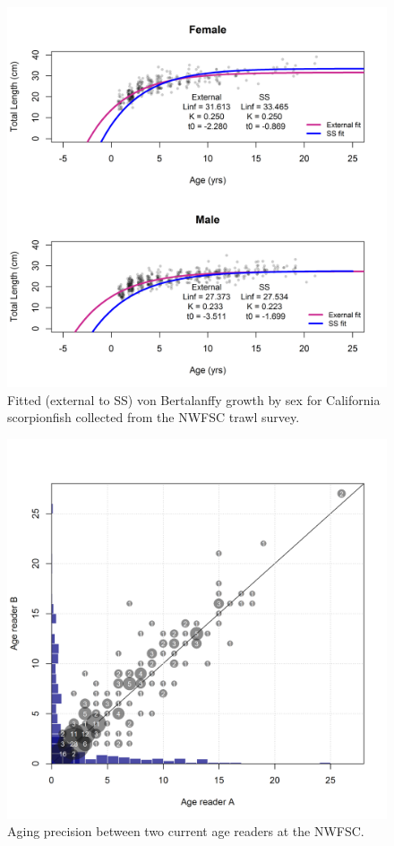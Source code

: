 \documentclass[12pt,]{article}
\begin{document}
\begin{figure}[htbp]
\centering
\includegraphics{Figures/vonB_compare.png}
\caption{Fitted (external to SS) von Bertalanffy growth by sex for
California scorpionfish collected from the NWFSC trawl survey.
\label{fig:vonB_compare}}
\end{figure}

\begin{figure}[htbp]
\centering
\includegraphics{Figures/Fleet8_NWFSCTrawl_ageerror.png}
\caption{Aging precision between two current age readers at the NWFSC.
\label{fig:Fleet8_NWFSCTrawl_ageerror}}
\end{figure}
\end{document}
